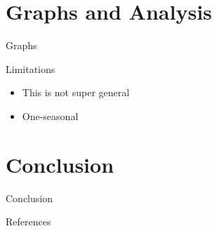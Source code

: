 \documentclass{beamer}
\begin{document}
\section{Graphs and Analysis}
\begin{frame}{Graphs}
    
\end{frame}

\begin{frame}{Limitations}
    \begin{itemize}
        \item This is not super general
        \item One-seasonal
    \end{itemize}
\end{frame}

\section{Conclusion}
\begin{frame}{Conclusion}
    
\end{frame}

\begin{frame}{References}
    
    
\end{frame}
\end{document}
